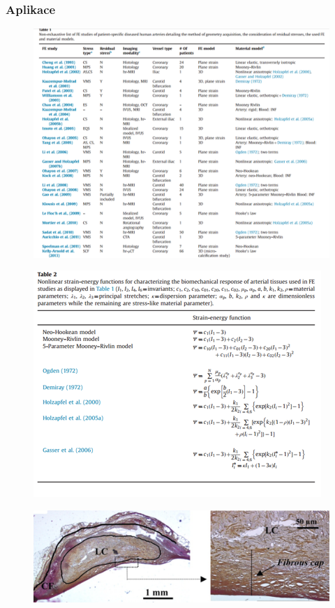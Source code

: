 \subsubsection{Aplikace}
\begin{figure}[H]
	\centering
	\includegraphics[width=0.7\linewidth]{Obrazky/neo-hooke-aplikace-1}
	\label{fig:neo-hooke-aplikace-1}
\end{figure}
\begin{figure}[H]
	\centering
	\includegraphics[width=0.7\linewidth]{Obrazky/neo-hooke-aplikace-2}
	\label{fig:neo-hooke-aplikace-2}
\end{figure}
\begin{figure}[H]
	\centering
	\includegraphics[width=0.7\linewidth]{Obrazky/neo-hooke-aplikace-3}
	\label{fig:neo-hooke-aplikace-3}
\end{figure}

